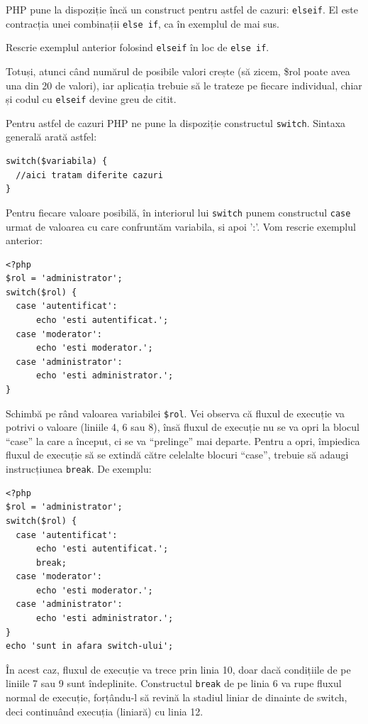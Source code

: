 PHP pune la dispoziție încă un construct pentru astfel de cazuri: \texttt{elseif}.
El este contracția unei combinații \texttt{else if}, ca în exemplul de mai sus.

\begin{Exercise}[title={elseif}]
Rescrie exemplul anterior folosind \texttt{elseif} în loc de \texttt{else if}.
\end{Exercise}

Totuși, atunci când numărul de posibile valori crește (să zicem, \$rol poate avea
una din 20 de valori), iar aplicația trebuie să le trateze pe fiecare individual,
chiar și codul cu \texttt{elseif} devine greu de citit.

Pentru astfel de cazuri PHP ne pune la dispoziție constructul \texttt{switch}.
Sintaxa generală arată astfel:
\begin{lstlisting}
switch($variabila) {
  //aici tratam diferite cazuri
}
\end{lstlisting}
Pentru fiecare valoare posibilă, în interiorul lui \texttt{switch}
punem constructul \texttt{case} urmat de valoarea cu care confruntăm
variabila, si apoi ':'. Vom rescrie exemplul anterior:

\begin{lstlisting}
<?php
$rol = 'administrator';
switch($rol) {
  case 'autentificat':
	  echo 'esti autentificat.';
  case 'moderator':
	  echo 'esti moderator.';
  case 'administrator':
	  echo 'esti administrator.';
}
\end{lstlisting}
Schimbă pe rând valoarea variabilei \texttt{\$rol}. Vei observa că
fluxul de execuție va potrivi o valoare (liniile 4, 6 sau 8), însă
fluxul de execuție nu se va opri la blocul ``case'' la care a început,
ci se va ``prelinge'' mai departe. Pentru a opri, împiedica fluxul de
execuție să se extindă către celelalte blocuri ``case'', trebuie să
adaugi instrucțiunea \texttt{break}. De exemplu:
\begin{lstlisting}
<?php
$rol = 'administrator';
switch($rol) {
  case 'autentificat':
	  echo 'esti autentificat.';
	  break;
  case 'moderator':
	  echo 'esti moderator.';
  case 'administrator':
	  echo 'esti administrator.';
}
echo 'sunt in afara switch-ului';
\end{lstlisting}
În acest caz, fluxul de execuție va trece prin linia 10, doar dacă
condițiile de pe liniile 7 sau 9 sunt îndeplinite. Constructul
\texttt{break} de pe linia 6 va rupe fluxul normal de execuție,
forțându-l să revină la stadiul liniar de dinainte de switch,
deci continuând execuția (liniară) cu linia 12.

